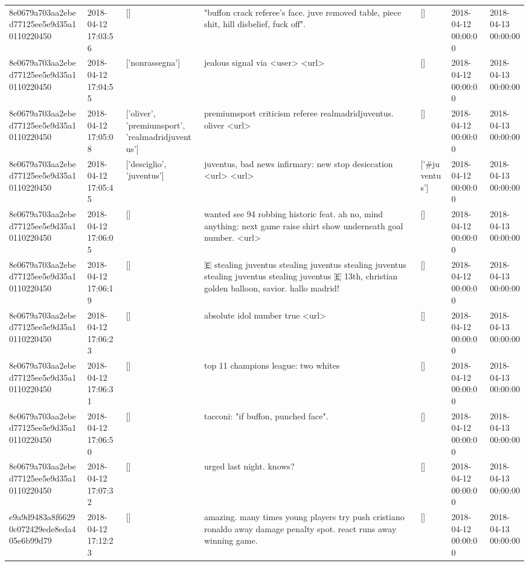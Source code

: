 \begin{tabular}{lllllll}
8e0679a703aa2ebed77125ee5e9d35a10110220450 & 2018-04-12 17:03:56 & [] & "buffon crack referee's face. juve removed table, piece shit, hill disbelief, fuck off". & [] & 2018-04-12 00:00:00 & 2018-04-13 00:00:00 \\
8e0679a703aa2ebed77125ee5e9d35a10110220450 & 2018-04-12 17:04:55 & ['nonrassegna'] & jealous signal via <user> <url> & [] & 2018-04-12 00:00:00 & 2018-04-13 00:00:00 \\
8e0679a703aa2ebed77125ee5e9d35a10110220450 & 2018-04-12 17:05:08 & ['oliver', 'premiumsport', 'realmadridjuventus'] & premiumsport criticism referee realmadridjuventus. oliver <url> & [] & 2018-04-12 00:00:00 & 2018-04-13 00:00:00 \\
8e0679a703aa2ebed77125ee5e9d35a10110220450 & 2018-04-12 17:05:45 & ['desciglio', 'juventus'] & juventus, bad news infirmary: new stop desiccation <url> <url> & ['#juventus'] & 2018-04-12 00:00:00 & 2018-04-13 00:00:00 \\
8e0679a703aa2ebed77125ee5e9d35a10110220450 & 2018-04-12 17:06:05 & [] & wanted see 94 robbing historic feat. ah no, mind anything: next game raise shirt show underneath goal number. <url> & [] & 2018-04-12 00:00:00 & 2018-04-13 00:00:00 \\
8e0679a703aa2ebed77125ee5e9d35a10110220450 & 2018-04-12 17:06:19 & [] & 🇪 stealing juventus stealing juventus stealing juventus stealing juventus stealing juventus 🇪 13th, christian golden balloon, savior. hallo madrid! & [] & 2018-04-12 00:00:00 & 2018-04-13 00:00:00 \\
8e0679a703aa2ebed77125ee5e9d35a10110220450 & 2018-04-12 17:06:23 & [] & absolute idol number true <url> & [] & 2018-04-12 00:00:00 & 2018-04-13 00:00:00 \\
8e0679a703aa2ebed77125ee5e9d35a10110220450 & 2018-04-12 17:06:31 & [] & top 11 champions league: two whites & [] & 2018-04-12 00:00:00 & 2018-04-13 00:00:00 \\
8e0679a703aa2ebed77125ee5e9d35a10110220450 & 2018-04-12 17:06:50 & [] & tacconi: "if buffon, punched face". & [] & 2018-04-12 00:00:00 & 2018-04-13 00:00:00 \\
8e0679a703aa2ebed77125ee5e9d35a10110220450 & 2018-04-12 17:07:32 & [] & urged last night. knows? & [] & 2018-04-12 00:00:00 & 2018-04-13 00:00:00 \\
e9a9d9483a8f66290c072429ede8eda405e6b99d79 & 2018-04-12 17:12:23 & [] & amazing. many times young players try push cristiano ronaldo away damage penalty spot. react runs away winning game. & [] & 2018-04-12 00:00:00 & 2018-04-13 00:00:00 \\

\end{tabular}
